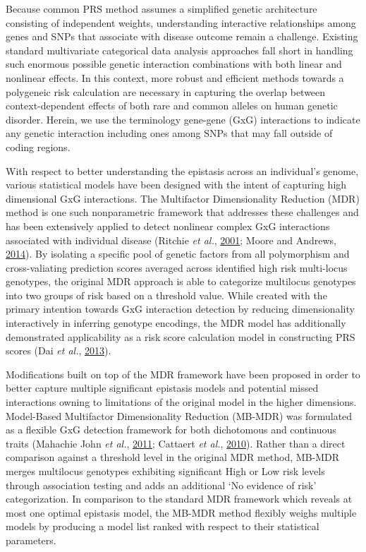\documentclass[a4paper,twoside, 9pt]{article}
\begin{document}
Because common PRS method assumes a simplified genetic architecture
consisting of independent weights, understanding interactive
relationships among genes and SNPs that associate with disease outcome
remain a challenge. Existing standard multivariate categorical data
analysis approaches fall short in handling such enormous possible
genetic interaction combinations with both linear and nonlinear effects.
In this context, more robust and efficient methods towards a polygeneic
risk calculation are necessary in capturing the overlap between
context-dependent effects of both rare and common alleles on human
genetic disorder. Herein, we use the terminology gene-gene (GxG)
interactions to indicate any genetic interaction including ones among
SNPs that may fall outside of coding regions.

With respect to better understanding the epistasis across an
individual's genome, various statistical models have been designed with
the intent of capturing high dimensional GxG interactions. The
Multifactor Dimensionality Reduction (MDR) method is one such
nonparametric framework that addresses these challenges and has been
extensively applied to detect nonlinear complex GxG interactions
associated with individual disease (Ritchie \emph{et al.},
\protect\hyperlink{ref-E26QhGxD}{2001}; Moore and Andrews,
\protect\hyperlink{ref-1BqLrlGsj}{2014}). By isolating a specific pool
of genetic factors from all polymorphism and cross-valiating prediction
scores averaged across identified high risk multi-locus genotypes, the
original MDR approach is able to categorize multilocus genotypes into
two groups of risk based on a threshold value. While created with the
primary intention towards GxG interaction detection by reducing
dimensionality interactively in inferring genotype encodings, the MDR
model has additionally demonstrated applicability as a risk score
calculation model in constructing PRS scores (Dai \emph{et al.},
\protect\hyperlink{ref-93PfLXPZ}{2013}).

Modifications built on top of the MDR framework have been proposed in
order to better capture multiple significant epistasis models and
potential missed interactions owning to limitations of the original
model in the higher dimensions. Model-Based Multifactor Dimensionality
Reduction (MB-MDR) was formulated as a flexible GxG detection framework
for both dichotomous and continuous traits (Mahachie John \emph{et al.},
\protect\hyperlink{ref-kN4MaLuT}{2011}; Cattaert \emph{et al.},
\protect\hyperlink{ref-16AnEAMje}{2010}). Rather than a direct
comparison against a threshold level in the original MDR method, MB-MDR
merges multilocus genotypes exhibiting significant High or Low risk
levels through association testing and adds an additional `No evidence
of risk' categorization. In comparison to the standard MDR framework
which reveals at most one optimal epistasis model, the MB-MDR method
flexibly weighs multiple models by producing a model list ranked with
respect to their statistical parameters.
\end{document}
